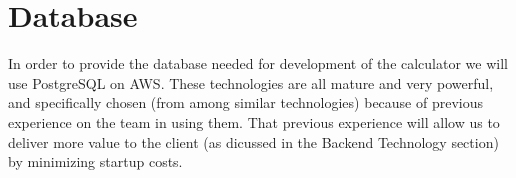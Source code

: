 \documentclass{article}
\begin{document}
\section*{Database}

In order to provide the database needed for development of the calculator
we will use PostgreSQL on AWS.
These technologies are all mature and very powerful,
and specifically chosen (from among similar technologies)
because of previous experience on the team in using them.
That previous experience will allow us
to deliver more value to the client
(as dicussed in the Backend Technology section)
by minimizing startup costs.
\end{document}
